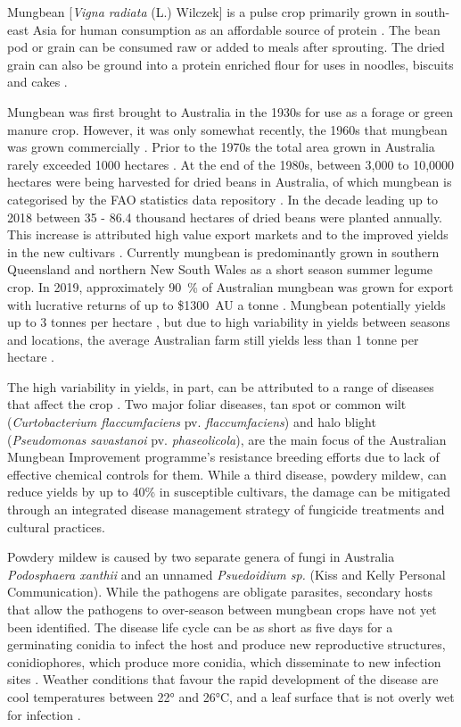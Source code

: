 \documentclass[agronomy,article,submit,moreauthors,pdftex]{mdpi}
\begin{document}

Mungbean {[}\emph{Vigna radiata} (L.) Wilczek{]} is a pulse crop primarily grown in south-east Asia for human consumption as an affordable source of protein \citep{Lambrides2007}.
The bean pod or grain can be consumed raw or added to meals after sprouting.
The dried grain can also be ground into a protein enriched flour for uses in noodles, biscuits and cakes \citep{Chankaew2013}.

Mungbean was first brought to Australia in the 1930s for use as a forage or green manure crop.
However, it was only somewhat recently, the 1960s that mungbean was grown commercially \citep{Lawn1978, Chauhan2018}.
Prior to the 1970s the total area grown in Australia rarely exceeded 1000 hectares \citep{Lawn1978}.
At the end of the 1980s, between 3,000 to 10,0000 hectares were being harvested for dried beans in Australia, of which mungbean is categorised by the FAO statistics data repository \citep{FAOSTAT}.
In the decade leading up to 2018 between 35 - 86.4 thousand hectares of dried beans were planted annually.
This increase is attributed high value export markets and to the improved yields in the new cultivars \citep{Clarry2016}.
Currently mungbean is predominantly grown in southern Queensland and northern New South Wales as a short season summer legume crop.
In 2019, approximately 90~\% of Australian mungbean was grown for export with lucrative returns of up to \$1300~AU a tonne \citep{QueenslandGovernment2019}.
Mungbean potentially yields up to 3 tonnes per hectare \citep{ThomasRobert2004}, but due to high variability in yields between seasons and locations, the average Australian farm still yields less than 1 tonne per hectare \citep{Chauhan2018}.

The high variability in yields, in part, can be attributed to a range of diseases that affect the crop \citep{Kelly2017a}.
Two major foliar diseases, tan spot or common wilt (\emph{Curtobacterium flaccumfaciens} pv. \emph{flaccumfaciens}) and halo blight (\emph{Pseudomonas savastanoi} pv. \emph{phaseolicola}), are the main focus of the Australian Mungbean Improvement programme's resistance breeding efforts due to lack of effective chemical controls for them.
While a third disease, powdery mildew, can reduce yields by up to 40\% \citep{Chankaew2013} in susceptible cultivars, the damage can be mitigated through an integrated disease management strategy of fungicide treatments and cultural practices.

Powdery mildew is caused by two separate genera of fungi in Australia \emph{Podosphaera xanthii} and an unnamed \emph{Psuedoidium sp.} (Kiss and Kelly Personal Communication).
While the pathogens are obligate parasites, secondary hosts that allow the pathogens to over-season between mungbean crops have not yet been identified.
The disease life cycle can be as short as five days for a germinating conidia to infect the host and produce new reproductive structures, conidiophores, which produce more conidia, which disseminate to new infection sites \citep{Sparks2017}.
Weather conditions that favour the rapid development of the disease are cool temperatures between 22° and 26°C, and a leaf surface that is not overly wet for infection \citep{Kelly2017a}.
\end{document}
